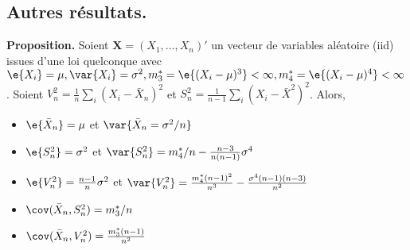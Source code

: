 \subsection{Autres résultats.}
\textbf{Proposition.} Soient $\boldsymbol{X}=(X_1,\dots,X_n)'$ un vecteur de variables aléatoire (iid) issues d'une loi quelconque avec $\e{X_i}=\mu, \var{X_i}=\sigma^2, m_3^*=\e{(X_i-\mu)^3} < \infty, m_4^*=\e{(X_i-\mu)^4} < \infty$. Soient $V^2_n=\frac{1}{n} \sum_i \left(X_i - \bar{X}_n \right)^2$ et $S^2_n = \frac{1}{n-1} \sum_i \left( X_i - \bar{X}^2 \right)^2$. Alors, 
\begin{itemize}
	\item $\e{\bar{X}_n}=\mu$ et $\var{\bar{X}_n=\sigma^2/n}$
	\item $\e{S_n^2}=\sigma^2$ et $\var{S_n^2}=m_4^*/n - \frac{n-3}{n(n-1)}\sigma^4$
	\item $\e{V_n^2}=\frac{n-1}{n}\sigma^2$ et $\var{V_n^2}=\frac{m^*_4(n-1)^2}{n^3} - \frac{\sigma^4(n-1)(n-3)}{n^2}$
	\item $\cov(\bar{X}_n,S^2_n)=m^*_3/n$
	\item $\cov(\bar{X}_n,V^2_n)=\frac{m^*_3(n-1)}{n^2}$
\end{itemize}